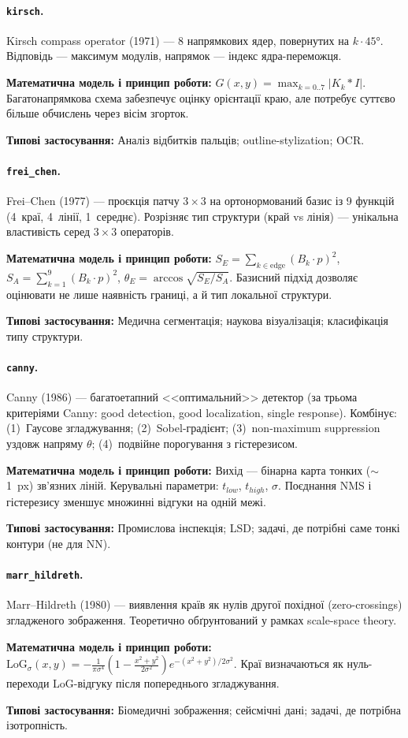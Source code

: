 \documentclass[a4paper,12pt]{article}
\newcommand{\algodesc}[6]{%
	\paragraph{\texttt{#1}.} #2

	\textbf{Математична модель і принцип роботи:} #3

	\textbf{Типові застосування:} #6
	\par\medskip
}
\begin{document}
\algodesc{kirsch}
{Kirsch compass operator (1971) --- 8 напрямкових ядер, повернутих на $k\cdot45°$. Відповідь --- максимум модулів, напрямок --- індекс ядра-переможця.}
{$G(x,y)=\max_{k=0..7}|K_k\ast I|$. Багатонапрямкова схема забезпечує оцінку орієнтації краю, але потребує суттєво більше обчислень через вісім згорток.}
{Дає напрямок краю за максимумом компасної відповіді; добре підкреслює товсті контури.}
{Погано векторизується (max-reduce замість MAC) і потребує суттєво більше обчислень.}
{Аналіз відбитків пальців; outline-stylization; OCR.}

\algodesc{frei\_chen}
{Frei--Chen (1977) --- проєкція патчу $3\times3$ на ортонормований базис із 9 функцій (4~краї, 4~лінії, 1~середнє). Розрізняє тип структури (край vs лінія) --- унікальна властивість серед $3\times3$ операторів.}
{$S_E=\sum_{k\in\text{edge}}(B_k\cdot p)^2$, $S_A=\sum_{k=1}^{9}(B_k\cdot p)^2$, $\theta_E=\arccos\sqrt{S_E/S_A}$. Базисний підхід дозволяє оцінювати не лише наявність границі, а й тип локальної структури.}
{Інваріантний до повороту в межах базисного представлення; розрізняє <<краї>> і <<лінії>>.}
{Дорожчий за Sobel (9 згорток); складніша інтерпретація.}
{Медична сегментація; наукова візуалізація; класифікація типу структури.}

\algodesc{canny}
{Canny (1986) --- багатоетапний <<оптимальний>> детектор (за трьома критеріями Canny: good detection, good localization, single response). Комбінує: (1)~Гаусове згладжування; (2)~Sobel-градієнт; (3)~non-maximum suppression уздовж напряму $\theta$; (4)~подвійне порогування з гістерезисом.}
{Вихід --- бінарна карта тонких ($\sim$1~px) зв'язних ліній. Керувальні параметри: $t_{low}$, $t_{high}$, $\sigma$. Поєднання NMS і гістерезису зменшує множинні відгуки на одній межі.}
{Дає найтонніші, найкраще локалізовані краї; стандарт у промисловому CV.}
{Бінарний вихід втрачає частину градієнтної інформації; параметри $t_{low/high}$ чутливі до контрасту та освітлення.}
{Промислова інспекція; LSD; задачі, де потрібні саме тонкі контури (не для NN).}

\algodesc{marr\_hildreth}
{Marr--Hildreth (1980) --- виявлення країв як нулів другої похідної (zero-crossings) згладженого зображення. Теоретично обґрунтований у рамках scale-space theory.}
{$\mathrm{LoG}_\sigma(x,y)=-\frac{1}{\pi\sigma^4}(1-\frac{x^2+y^2}{2\sigma^2})e^{-(x^2+y^2)/2\sigma^2}$. Краї визначаються як нуль-переходи LoG-відгуку після попереднього згладжування.}
{Ізотропний і теоретично узгоджений із scale-space підходом; формує замкнені контури через нуль-переходи.}
{Дорожчий за Sobel; артефакт <<вуса>> (замкнені помилкові контури); чутливий до $\sigma$.}
{Біомедичні зображення; сейсмічні дані; задачі, де потрібна ізотропність.}
\end{document}
